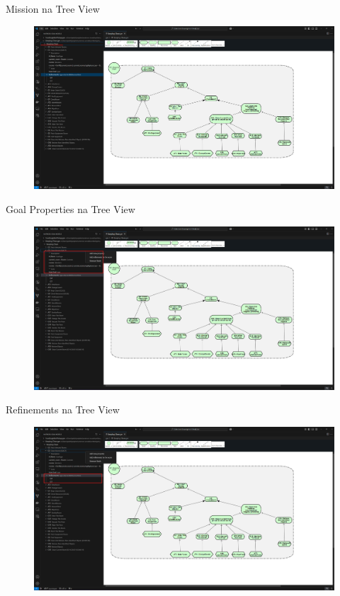 \documentclass{beamer}
\begin{document}
\begin{frame}{Mission na Tree View}
  \begin{figure}[!h]
    \centering
    \includegraphics[width=1\textwidth]{missionfocus.png} 
    \caption{}
  \end{figure}
\end{frame}
\begin{frame}{Goal Properties na Tree View}
  \begin{figure}[!h]
    \centering
    \includegraphics[width=1\textwidth]{node properties.png} 
    \caption{}
  \end{figure}
\end{frame}
\begin{frame}{Refinements na Tree View}
  \begin{figure}[!h]
    \centering
    \includegraphics[width=1\textwidth]{refinements.png} 
    \caption{}
  \end{figure}
\end{frame}
\end{document}
